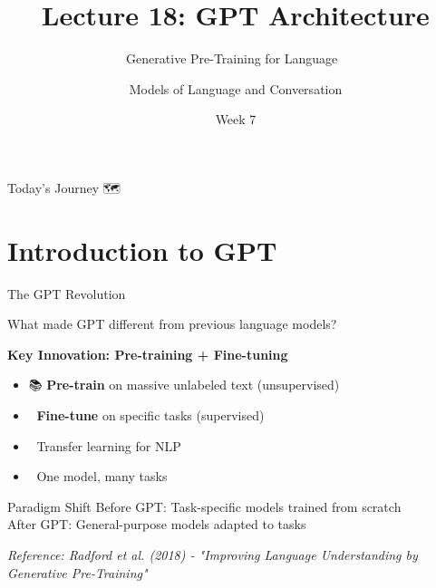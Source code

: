\documentclass[aspectratio=169]{beamer}
\title{Lecture 18: GPT Architecture}
\subtitle{Generative Pre-Training for Language 🤖}
\author{Models of Language and Conversation}
\institute{Dr. Jeremy R. Manning}
\date{Week 7}
\begin{document}
\begin{frame}
    \titlepage
\end{frame}

\begin{frame}{Today's Journey 🗺️}
    \tableofcontents
\end{frame}

\section{Introduction to GPT}

\begin{frame}{The GPT Revolution 🚀}
    \begin{discussion}
        What made GPT different from previous language models?
    \end{discussion}

    \vspace{0.3cm}

    \textbf{Key Innovation: Pre-training + Fine-tuning}
    \begin{itemize}\setlength{\itemsep}{0pt}
        \item 📚 \textbf{Pre-train} on massive unlabeled text (unsupervised)
        \item 🎯 \textbf{Fine-tune} on specific tasks (supervised)
        \item 🔄 Transfer learning for NLP
        \item 🎨 One model, many tasks
    \end{itemize}

    \vspace{0.3cm}

    \begin{alertblock}{Paradigm Shift}
        Before GPT: Task-specific models trained from scratch \\
        After GPT: General-purpose models adapted to tasks
    \end{alertblock}

    \vspace{0.3cm}

    \small
    \textit{Reference: Radford et al. (2018) - "Improving Language Understanding by Generative Pre-Training"}
\end{frame}
\end{document}
